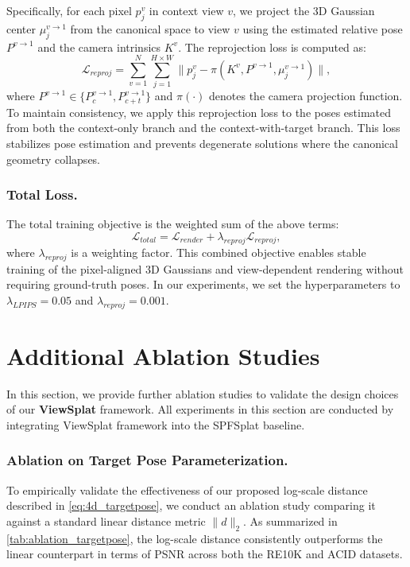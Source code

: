 Specifically, for each pixel $p_j^v$ in context view $v$, we project the 3D Gaussian center $\mu_j^{v \to 1}$ from the canonical space to view $v$ using the estimated relative pose $P^{v \to 1}$ and the camera intrinsics $K^v$. The reprojection loss is computed as:
\begin{equation}
    \mathcal{L}_{reproj} = \sum_{v=1}^N  \sum_{j=1}^{H \times W} \|p_j^v - \pi(K^v, P^{v \to 1}, \mu_j^{v \to 1})\|,
    \label{eq:reprojectionloss}
\end{equation}
where $P^{v \to 1} \in \{P_c^{v \to 1}, P_{c+t}^{v \to 1}\}$ and $\pi(\cdot)$ denotes the camera projection function. To maintain consistency, we apply this reprojection loss to the poses estimated from both the context-only branch and the context-with-target branch. This loss stabilizes pose estimation and prevents degenerate solutions where the canonical geometry collapses.

\subsubsection{Total Loss.} The total training objective is the weighted sum of the above terms:
\begin{equation}
    \mathcal{L}_{total} = \mathcal{L}_{render} + \lambda_{reproj}\mathcal{L}_{reproj},
    \label{eq:supp_totalloss}
\end{equation}
where $\lambda_{reproj}$ is a weighting factor. This combined objective enables stable training of the pixel-aligned 3D Gaussians and view-dependent rendering without requiring ground-truth poses. In our experiments, we set the hyperparameters to $\lambda_{LPIPS}=0.05$ and $\lambda_{reproj}=0.001$.

\section{Additional Ablation Studies}
In this section, we provide further ablation studies to validate the design choices of our \textbf{ViewSplat} framework. All experiments in this section are conducted by integrating ViewSplat framework into the SPFSplat \cite{huang2025spfsplat} baseline.

\subsubsection{Ablation on Target Pose Parameterization.}
To empirically validate the effectiveness of our proposed log-scale distance described in \cref{eq:4d_targetpose}, we conduct an ablation study comparing it against a standard linear distance metric $\|d\|_2$. As summarized in \cref{tab:ablation_targetpose}, the log-scale distance consistently outperforms the linear counterpart in terms of PSNR across both the RE10K \cite{zhou2018re10k} and ACID \cite{liu2021acid} datasets.

